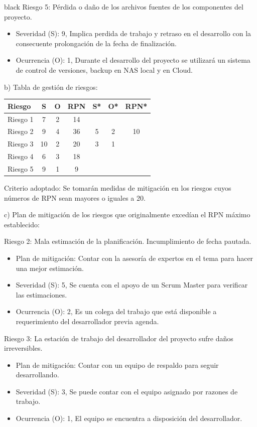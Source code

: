 \documentclass[11pt]{charter}
\begin{document}
\begin{consigna}{black}
Riesgo 5: Pérdida o daño de los archivos fuentes de los componentes del proyecto. 
\begin{itemize}
\item Severidad (S): 9, Implica perdida de trabajo y retraso en el desarrollo con la consecuente prolongación de la fecha de finalización.
\item Ocurrencia (O): 1, Durante el desarrollo del proyecto se utilizará un sistema de control de versiones, backup en NAS local y en Cloud.
\end{itemize}	
							
\newpage		
b) Tabla de gestión de riesgos: 

\begin{table}[htpb]
\centering
\begin{tabularx}{\linewidth}{@{}|X|c|c|c|c|c|c|@{}}
\hline
\rowcolor[HTML]{418ddc} 
Riesgo & S & O & RPN & S* & O* & RPN* \\ \hline
Riesgo 1 & 7  & 2 & 14 &   &   &    \\
Riesgo 2 & 9  & 4 & 36 & 5 & 2 & 10 \\
Riesgo 3 & 10 & 2 & 20 & 3 & 1 &    \\
Riesgo 4 & 6  & 3 & 18 &   &   &    \\
Riesgo 5 & 9  & 1 & 9  &   &   &
\end{tabularx}
\end{table}

Criterio adoptado: 
Se tomarán medidas de mitigación en los riesgos cuyos números de RPN sean mayores o iguales a 20.
							
c) Plan de mitigación de los riesgos que originalmente excedían el RPN máximo establecido:		
					
Riesgo 2: Mala estimación de la planificación. Incumplimiento de fecha pautada.
\begin{itemize}
\item Plan de mitigación: Contar con la asesoría de expertos en el tema para hacer una mejor estimación.
\item Severidad (S): 5, Se cuenta con el apoyo de un Scrum Master para verificar las estimaciones.
\item Ocurrencia (O): 2, Es un colega del trabajo que está disponible a requerimiento del desarrollador previa agenda.
\end{itemize}

Riesgo 3: La estación de trabajo del desarrollador del proyecto sufre daños irreversibles.  
\begin{itemize}
\item Plan de mitigación: Contar con un equipo de respaldo para seguir desarrollando.
\item Severidad (S): 3, Se puede contar con el equipo asignado por razones de trabajo.
\item Ocurrencia (O): 1, El equipo se encuentra a disposición del desarrollador.
\end{itemize}

\end{consigna}
\end{document}
